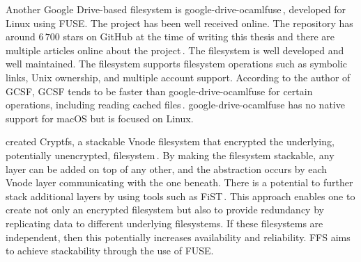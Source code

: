 Another Google \mbox{Drive-based} filesystem is \mbox{google-drive-ocamlfuse}\,\cite{stradaGoogledriveocamlfuse2022}, developed for Linux using \gls{FUSE}. The project has been well received online. The repository has around $6\,700$ stars on GitHub at the time of writing this thesis and there are multiple articles online about the project\,\cite{guoanInstallGoogleDrive2021,sneddonMountYourGoogle2017,aminUseGoogleDrive2021}. The filesystem is well developed and well maintained. The filesystem supports filesystem operations such as symbolic links, Unix ownership, and multiple account support. According to the author of \gls{GCSF}, \gls{GCSF} tends to be faster than \mbox{google-drive-ocamlfuse} for certain operations, including reading cached files\,\cite{sergiudanShortGCSFTends2018,puscassergiudanShowHNGoogle2018}. \mbox{google-drive-ocamlfuse} has no native support for macOS but is focused on Linux. 

\citeauthor{zadokCryptfsStackableVnode1998} created Cryptfs, a stackable Vnode filesystem that encrypted the underlying, potentially unencrypted, filesystem\,\cite{zadokCryptfsStackableVnode1998}. By making the filesystem stackable, any layer can be added on top of any other, and the abstraction occurs by each Vnode layer communicating with the one beneath. There is a potential to further stack additional layers by using tools such as FiST\,\cite{zadokFiSTStackableFile}. This approach enables one to create not only an encrypted filesystem but also to provide redundancy by replicating data to different underlying filesystems. If these filesystems are independent, then this potentially increases availability and reliability. \gls{FFS} aims to achieve stackability through the use of \gls{FUSE}. 

%
